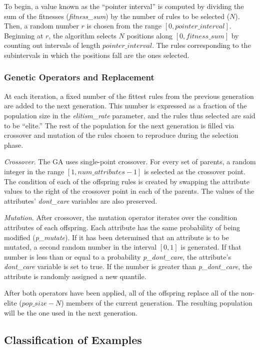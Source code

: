 \documentclass[12pt]{article}
\begin{document}
To begin, a value known as the ``pointer interval'' is computed by dividing the sum of the fitnesses (\emph{fitness\_sum}) by the number of rules to be selected ($N$). Then, a random number $r$ is chosen from the range $[0, pointer\_interval]$. Beginning at $r$, the algorithm selects $N$ positions along $[0, fitness\_sum]$ by counting out intervals of length $pointer\_interval$. The rules corresponding to the subintervals in which the positions fall are the ones selected.

\subsubsection{Genetic Operators and Replacement}

At each iteration, a fixed number of the fittest rules from the previous generation are added to the next generation. This number is expressed as a fraction of the population size in the \emph{elitism\_rate} parameter, and the rules thus selected are said to be ``elite.'' The rest of the population for the next generation is filled via crossover and mutation of the rules chosen to reproduce during the selection phase.

\emph{Crossover}. The GA uses single-point crossover. For every set of parents, a random integer in the range $[1, num\_attributes - 1]$ is selected as the crossover point. The condition of each of the offspring rules is created by swapping the attribute values to the right of the crossover point in each of the parents. The values of the attributes' \emph{dont\_care} variables are also preserved.

\emph{Mutation}. After crossover, the mutation operator iterates over the condition attributes of each offspring. Each attribute has the same probability of being modified (\emph{p\_mutate}). If it has been determined that an attribute is to be mutated, a second random number in the interval $[0,1]$ is generated. If that number is less than or equal to a probability \emph{p\_dont\_care}, the attribute's \emph{dont\_care} variable is set to true. If the number is greater than \emph{p\_dont\_care}, the attribute is randomly assigned a new quantile.

After both operators have been applied, all of the offspring replace all of the non-elite ($pop\_size - N$) members of the current generation. The resulting population will be the one used in the next generation.

\subsection{Classification of Examples}
\end{document}
